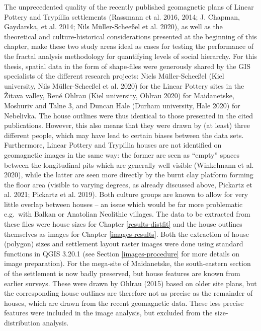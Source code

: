 \documentclass[
  12pt,
  a4paper, twoside]{book}
\begin{document}
The unprecedented quality of the recently published geomagnetic plans of Linear Pottery and Trypillia settlements (Rassmann et al. 2016, 2014; J. Chapman, Gaydarska, et al. 2014; Nils Müller-Scheeßel et al. 2020), as well as the theoretical and culture-historical considerations presented at the beginning of this chapter, make these two study areas ideal as cases for testing the performance of the fractal analysis methodology for quantifying levels of social hierarchy. For this thesis, spatial data in the form of shape-files were generously shared by the GIS specialists of the different research projects: Niels Müller-Scheeßel (Kiel university, Nils Müller-Scheeßel et al. 2020) for the Linear Pottery sites in the Žitava valley, René Ohlrau (Kiel university, Ohlrau 2020) for Maidanetske, Moshuriv and Talne 3, and Duncan Hale (Durham university, Hale 2020) for Nebelivka. The house outlines were thus identical to those presented in the cited publications. However, this also means that they were drawn by (at least) three different people, which may have lead to certain biases between the data sets. Furthermore, Linear Pottery and Trypillia houses are not identified on geomagnetic images in the same way: the former are seen as ``empty'' spaces between the longitudinal pits which are generally well visible (Winkelmann et al. 2020), while the latter are seen more directly by the burnt clay platform forming the floor area (visible to varying degrees, as already discussed above, Pickartz et al. 2021; Pickartz et al. 2019). Both culture groups are known to allow for very little overlap between houses -- an issue which would be far more problematic e.g.~with Balkan or Anatolian Neolithic villages. The data to be extracted from these files were house sizes for Chapter \ref{results-distfit} and the house outlines themselves as images for Chapter \ref{images-results}. Both the extraction of house (polygon) sizes and settlement layout raster images were done using standard functions in QGIS 3.20.1 (see Section \ref{images-procedure} for more details on image preparation). For the mega-site of Maidanetske, the south-eastern section of the settlement is now badly preserved, but house features are known from earlier surveys. These were drawn by Ohlrau (2015) based on older site plans, but the corresponding house outlines are therefore not as precise as the remainder of houses, which are drawn from the recent geomagnetic data. These less precise features were included in the image analysis, but excluded from the size-distribution analysis.
\end{document}
